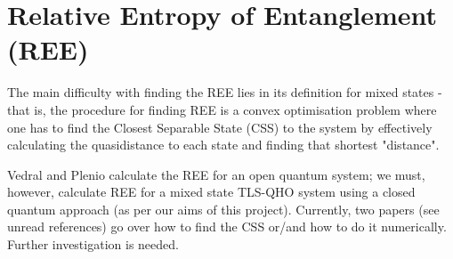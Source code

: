 \documentclass[12pt]{article}
\begin{document}
\section{Relative Entropy of Entanglement (REE)}
The main difficulty with finding the REE lies in its definition for mixed states - that is, the procedure for finding REE is a convex optimisation problem where one has to find the Closest Separable State (CSS)\cite{unread_pdf} to the system by effectively calculating the quasidistance to each state and finding that shortest "distance".

Vedral and Plenio calculate the REE\cite{E_REE_VN_applied} for an open quantum system; we must, however, calculate REE for a mixed state TLS-QHO system using a closed quantum approach (as per our aims of this project). Currently, two papers (see unread references) go over how to find the CSS or/and how to do it numerically. Further investigation is needed.


\newpage
 
 
\end{document}
